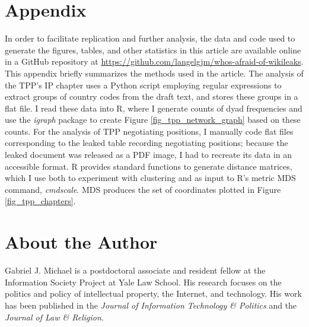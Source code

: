 \documentclass[12pt]{article}
\begin{document}
\section*{Appendix}

In order to facilitate replication and further analysis, the data and code used to 
generate the figures, tables, and other statistics in this article are available online 
in a GitHub repository at \href{https://github.com/langelgjm/whos-afraid-of-wikileaks}{https://github.com/langelgjm/whos-afraid-of-wikileaks}. This appendix briefly summarizes the methods used in the 
article. The analysis of the TPP's IP chapter uses a Python script employing regular expressions to extract groups of country 
codes from the draft text, and stores these groups in a flat file. I read these data 
into R, where I generate counts of dyad frequencies and use the \emph{igraph} package to 
create Figure \ref{fig_tpp_network_graph} based on these counts.
For the analysis of TPP negotiating positions, I manually code flat files corresponding 
to the leaked table recording negotiating positions; because the leaked document was released as a PDF image, 
I had to recreate its data in an accessible format. R provides standard functions to generate distance matrices, 
which I use both to experiment with clustering and as input to R's metric MDS 
command, \emph{cmdscale}. MDS produces the set of coordinates plotted in Figure \ref{fig_tpp_chapters}.

\theendnotes

\section*{About the Author}

Gabriel J. Michael is a postdoctoral associate and resident fellow at the Information Society Project 
at Yale Law School. His research focuses on the politics and policy of intellectual property, the Internet, and technology. 
His work has been published in the \emph{Journal of Information Technology \& Politics} 
and the \emph{Journal of Law \& Religion}.



\end{document}

